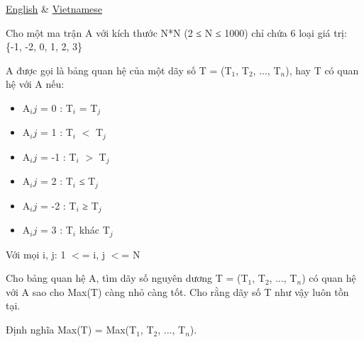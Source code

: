 \begin{tabular}\href{/problems/RELBOARD/en/}{English} & \href{/problems/RELBOARD/vn/}{Vietnamese}
\end{tabular}

Cho một ma trận A với kích thước N*N (2 ≤ N ≤ 1000) chỉ chứa 6 loại giá trị:  \{-1, -2, 0, 1, 2, 3\}

A được gọi là bảng quan hệ của một dãy số T = (T$_1$, T$_2$, ..., T$_n$), hay T có quan hệ với A nếu:
\begin{itemize}
	\item A$_ij$ = 0  : T$_i$ = T$_j$
	\item A$_ij$ = 1  : T$_i$ $<$ T$_j$
	\item A$_ij$ = -1 : T$_i$ $>$ T$_j$
	\item A$_ij$ = 2  : T$_i$ ≤ T$_j$
	\item A$_ij$ = -2 : T$_i$ ≥ T$_j$
	\item A$_ij$ = 3  : T$_i$ khác T$_j$
\end{itemize}

Với mọi i, j: 1 $<$= i, j $<$= N

Cho bảng quan hệ A, tìm dãy số nguyên dương T = (T$_1$, T$_2$, ..., T$_n$) có quan hệ với A sao cho Max(T) càng nhỏ càng tốt. Cho rằng dãy số T như vậy luôn tồn tại. 

Định nghĩa Max(T) = Max(T$_1$, T$_2$, ..., T$_n$).